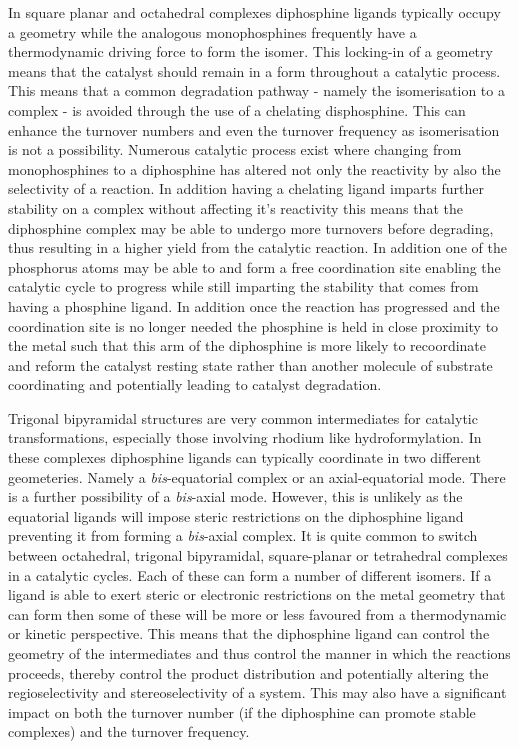 In square planar and octahedral complexes diphosphine ligands typically occupy a \cis{} geometry while the analogous monophosphines frequently have a thermodynamic driving force to form the \trans{} isomer.  This locking-in of a \cis{} geometry means that the catalyst should remain in a \cis{} form throughout a catalytic process.  This means that a common degradation pathway - namely the isomerisation to a \trans{} complex - is avoided through the use of a chelating disphosphine.  This can enhance the turnover numbers and even the turnover frequency as isomerisation is not a possibility.  Numerous catalytic process exist where changing from monophosphines to a diphosphine has altered not only the reactivity by also the selectivity of a reaction.  In addition having a chelating ligand imparts further stability on a complex without affecting it's reactivity  this means that the diphosphine complex may be able to undergo more turnovers before degrading, thus resulting in a higher yield from the catalytic reaction.  In addition one of the phosphorus atoms may be able to  and form a free coordination site enabling the catalytic cycle to progress while still imparting the stability that comes from having a phosphine ligand.  In addition once the reaction has progressed and the coordination site is no longer needed the phosphine is held in close proximity to the metal such that this arm of the diphosphine is more likely to recoordinate and reform the catalyst resting state rather than another molecule of substrate coordinating and potentially leading to catalyst degradation.  

Trigonal bipyramidal structures are very common intermediates for catalytic transformations, especially those involving rhodium like hydroformylation.  In these complexes diphosphine ligands can typically coordinate in two different geometeries.  Namely a \emph{bis}-equatorial complex or an axial-equatorial mode.  There is a further possibility of a \emph{bis}-axial mode.  However, this is unlikely as the equatorial ligands will impose steric restrictions on the diphosphine ligand preventing it from forming a \emph{bis}-axial complex.  It is quite common to switch between octahedral, trigonal bipyramidal, square-planar or tetrahedral complexes in a catalytic cycles.  Each of these can form a number of different isomers.  If a ligand is able to exert steric or electronic restrictions on the metal geometry that can form then some of these will be more or less favoured from a thermodynamic or kinetic perspective.  This means that the diphosphine ligand can control the geometry of the intermediates and thus control the manner in which the reactions proceeds, thereby control the product distribution and potentially altering the regioselectivity and stereoselectivity of a system.  This may also have a significant impact on both the turnover number (if the diphosphine can promote stable complexes) and the turnover frequency. 

